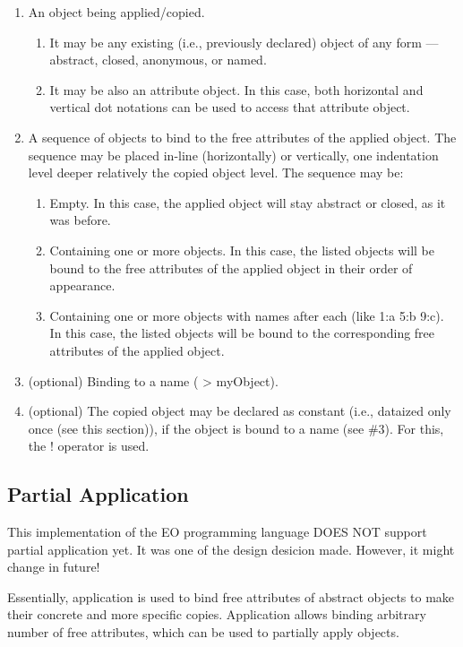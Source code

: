 \documentclass[12pt]{book}
\begin{document}
\begin{enumerate}
    \item An object being applied/copied.
    \begin{enumerate}
        \item It may be any existing (i.e., previously declared) object of any form — abstract, closed, anonymous, or named.
        \item It may be also an attribute object. In this case, both horizontal and vertical dot notations can be used to access that attribute object.
    \end{enumerate}
    \item A sequence of objects to bind to the free attributes of the applied object. The sequence may be placed in-line (horizontally) or vertically, one indentation level deeper relatively the copied object level. The sequence may be:
    \begin{enumerate}
        \item Empty. In this case, the applied object will stay abstract or closed, as it was before.
        \item Containing one or more objects. In this case, the listed objects will be bound to the free attributes of the applied object in their order of appearance.
        \item Containing one or more objects with names after each (like 1:a 5:b 9:c). In this case, the listed objects will be bound to the corresponding free attributes of the applied object.
    \end{enumerate}
    \item (optional) Binding to a name ( > myObject).
    \item (optional) The copied object may be declared as constant (i.e., dataized only once (see this section)), if the object is bound to a name (see \#3). For this, the ! operator is used.
\end{enumerate}

\subsection{Partial Application}
This implementation of the EO programming language DOES NOT support partial application yet. It was one of the design desicion made. However, it might change in future!

Essentially, application is used to bind free attributes of abstract objects to make their concrete and more specific copies. Application allows binding arbitrary number of free attributes, which can be used to partially apply objects.
\end{document}
